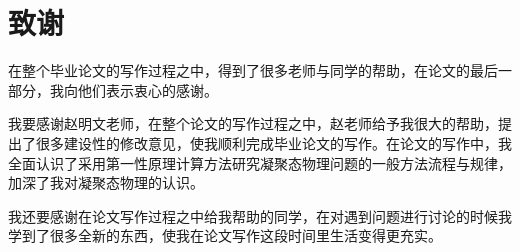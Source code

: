 \chapter*{致谢}

在整个毕业论文的写作过程之中，得到了很多老师与同学的帮助，在论文的最后一部分，我向他们表示衷心的感谢。

我要感谢赵明文老师，在整个论文的写作过程之中，赵老师给予我很大的帮助，提出了很多建设性的修改意见，使我顺利完成毕业论文的写作。在论文的写作中，我全面认识了采用第一性原理计算方法研究凝聚态物理问题的一般方法流程与规律，加深了我对凝聚态物理的认识。

我还要感谢在论文写作过程之中给我帮助的同学，在对遇到问题进行讨论的时候我学到了很多全新的东西，使我在论文写作这段时间里生活变得更充实。